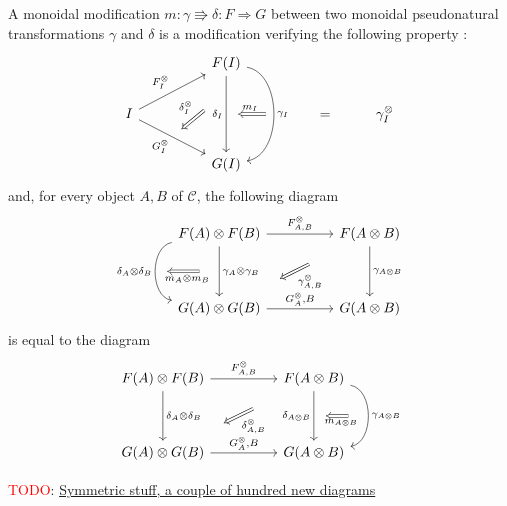 \documentclass[10pt]{llncs}
\newcommand{\todo}[1]{\textcolor{red}{TODO}: \underline{#1}}
\begin{document}
\begin{definition}
A monoidal modification $m: \gamma \Rrightarrow \delta : F \Rightarrow G$ between two monoidal pseudonatural transformations $\gamma$ and $\delta$ is a modification verifying the following property : 
$$\begin{tikzcd}
&&
F(I)
\arrow[swap]{dd}[name=B, near start]{}[name=C]{\delta_I}
\arrow[bend left = 80]{dd}[name=D]{\gamma_I}
\\
I
\arrow{rru}{F^{\otimes}_{I}}
\arrow[swap]{rrd}[name=A]{G^{\otimes}_{I}}
&&
&&
=
&
\gamma^{\otimes}_I
\\
&&
G(I)
\arrow[Rightarrow,from = B,to=A, shorten >=0.3cm, shorten <=0.5cm,swap]{}{\delta^{\otimes}_{I}}
\arrow[Rightarrow,from = D,to=C, shorten >=0.3cm, shorten <=0.2cm,swap]{}{m_I}
\end{tikzcd}$$
and, for every object $A,B$ of $\mathcal{C}$, the following diagram
$$
\begin{tikzcd}
F(A) \otimes F(B)
\arrow{rr}{F^{\otimes}_{A,B}}
\arrow{dd}{\gamma_A \otimes \gamma_B}[name=A]{}
\arrow[bend right = 80,swap]{dd}{\delta_A \otimes \delta_B}[name=B]{}
&&
F(A \otimes B)
\arrow[Rightarrow,shorten >=1.0cm, shorten <=1.0cm]{ddll}{\gamma^{\otimes}_{A,B}}
\arrow{dd}{\gamma_{A \otimes B}}
\\
\\
G(A) \otimes G(B)
\arrow{rr}{G^{\otimes}_A,B}
&&
G(A \otimes B)
\arrow[Rightarrow, from=A,to=B,shorten >=0.3cm, shorten <=0.5cm]{}{m_A \otimes m_B}
\end{tikzcd}
$$
is equal to the diagram
$$
\begin{tikzcd}
F(A) \otimes F(B)
\arrow{rr}{F^{\otimes}_{A,B}}
\arrow{dd}{\delta_A \otimes \delta_B}
&&
F(A \otimes B)
\arrow[Rightarrow,shorten >=1.0cm, shorten <=1.0cm]{ddll}{\delta^{\otimes}_{A,B}}
\arrow[swap]{dd}{\delta_{A \otimes B}}[name=A]{}
\arrow[bend left = 80]{dd}{\gamma_{A \otimes B}}[name=B]{}
\\
\\
G(A) \otimes G(B)
\arrow{rr}{G^{\otimes}_A,B}
&&
G(A \otimes B)
\arrow[Rightarrow, from=B,to=A,shorten >=0.3cm, shorten <=0.5cm]{}{m_{A \otimes B}}
\end{tikzcd}
$$
\end{definition}


\todo{Symmetric stuff, a couple of hundred new diagrams}
\end{document}
